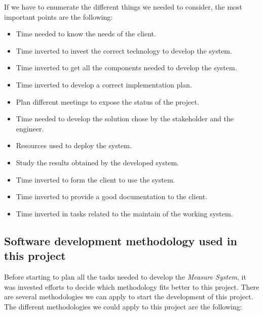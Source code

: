 If we have to enumerate the different things we needed to consider, the most important points are the following:

\begin{itemize}
\item Time needed to know the needs of the client.
\item Time inverted to invest the correct technology to develop the system.
\item Time inverted to get all the components needed to develop the system.
\item Time inverted to develop a correct implementation plan.
\item Plan different meetings to expose the status of the project.
\item Time needed to develop the solution chose by the stakeholder and the engineer.
\item Resources used to deploy the system.
\item Study the results obtained by the developed system.
\item Time inverted to form the client to use the system.
\item Time inverted to provide a good documentation to the client.
\item Time inverted in tasks related to the maintain of the working system.
\end{itemize}

\subsection{Software development methodology used in this project}

Before starting to plan all the tasks needed to develop the \textit{Measure System}, it was invested efforts to decide which methodology fits better to this project. There are several methodologies we can apply to start the development of this project. The different methodologies we could apply to this project are the following:


